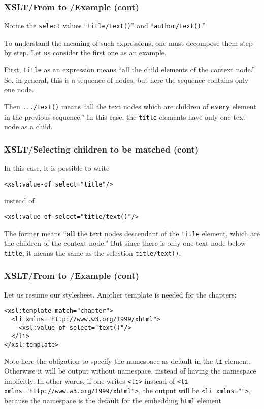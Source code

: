 %
\begin{frame}
\frametitle{XSLT/From \XML to \XHTML{}/Example (cont)}

Notice the \texttt{select} values ``\texttt{title/text()}'' and
``\texttt{author/text()}.''

\bigskip

To understand the meaning of such expressions, one must decompose them
step by step. Let us consider the first one as an example.

\bigskip

First, \texttt{title} as an expression means ``all the child elements
of the context node.'' So, in general, this is a sequence of nodes,
but here the sequence contains only one node.

\bigskip

Then \texttt{.../text()} means ``all the text nodes which are
children of \textbf{every} element in the previous sequence.'' In this
case, the \texttt{title} elements have only one text node as a child.

\end{frame}

%
\begin{frame}[containsverbatim]
\frametitle{XSLT/Selecting children to be matched (cont)}

In this case, it is possible to write
{\small
\begin{verbatim}
<xsl:value-of select="title"/>
\end{verbatim}
}
instead of
{\small
\begin{verbatim}
<xsl:value-of select="title/text()"/>
\end{verbatim}
}
The former means ``\textbf{all} the text nodes descendant of the
\texttt{title} element, which are the children of the context node.''
But since there is only one text node below \texttt{title}, it means
the same as the selection \texttt{title/text()}.

\end{frame}

%
\begin{frame}[containsverbatim]
\frametitle{XSLT/From \XML to \XHTML{}/Example (cont)}

Let us resume our stylesheet. Another template is needed for the
chapters:
{\small
\begin{verbatim}
<xsl:template match="chapter">
  <li xmlns="http://www.w3.org/1999/xhtml">
    <xsl:value-of select="text()"/>
  </li>
</xsl:template>
\end{verbatim}
}
Note here the obligation to specify the \XHTML namespace as default
in the \XHTML \texttt{li} element. Otherwise it will be output without
namespace, instead of having the \XHTML namespace implicitly. In other
words, if one writes \verb|<li>| instead of
\verb|<li xmlns="http://www.w3.org/1999/xhtml">|, the output will be
\verb|<li xmlns="">|, because the \XHTML namespace is the default for
the embedding \texttt{html} element.

\end{frame}

